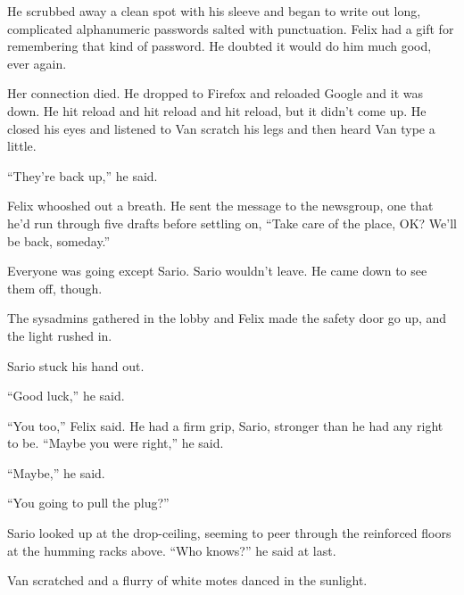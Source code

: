 He scrubbed away a clean spot with his sleeve and began to write
out long, complicated alphanumeric passwords salted with
punctuation. Felix had a gift for remembering that kind of
password. He doubted it would do him much good, ever again.

\tb

Her connection died. He dropped to Firefox and reloaded Google and
it was down. He hit reload and hit reload and hit reload, but it
didn’t come up. He closed his eyes and listened to Van scratch his
legs and then heard Van type a little.

“They’re back up,” he said.

Felix whooshed out a breath. He sent the message to the newsgroup,
one that he’d run through five drafts before settling on, “Take
care of the place, OK? We’ll be back, someday.”

Everyone was going except Sario. Sario wouldn’t leave. He came down
to see them off, though.

The sysadmins gathered in the lobby and Felix made the safety door
go up, and the light rushed in.

Sario stuck his hand out.

“Good luck,” he said.

“You too,” Felix said. He had a firm grip, Sario, stronger than he
had any right to be. “Maybe you were right,” he said.

“Maybe,” he said.

“You going to pull the plug?”

Sario looked up at the drop-ceiling, seeming to peer through the
reinforced floors at the humming racks above. “Who knows?” he said
at last.

Van scratched and a flurry of white motes danced in the sunlight.

